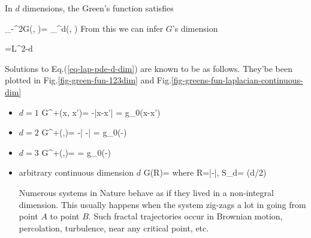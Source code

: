 In $d$ dimensions, the Green's function
satisfies

\beq
{}_{-\nabla^2G(\vecr, \vecrp)}=
_{\delta^d(\vecr, \vecrp)}
\label{eq-lap-pde-d-dim}
\eeq
From this we can infer
$G$'s dimension

\beq
{}=L^{2-d}
\eeq

Solutions to
Eq.(\ref{eq-lap-pde-d-dim})
are known to be as follows.
They'be been plotted
in Fig.\ref{fig-green-fun-123dim}
and Fig.\ref{fig-greens-fun-laplacian-continuous-dim}
\begin{itemize}
\item $d=1$
\beq
G^+(x, x')= -\;|x-x'| = g_0(x-x')
\eeq
\item $d=2$
\beq
G^+(\vecr,\vecrp)= -\;\ln |\vecr
-\vecrp| = g_0(\vecr-\vecrp)
\eeq
\item $d=3$
\beq
G^+(\vecr,\vecrp)= \; = g_0(\vecr-\vecrp)
\eeq


\item arbitrary continuous dimension $d$
\beq
G(R)=
\eeq
where
\beq 
R=|\vecr-\vecrp|, \quad S_d= 
{\Gamma(d/2)}
\eeq

Numerous systems in Nature
behave as if they lived
in a non-integral dimension.
This usually happens
when the system zig-zags a lot
in going from point $A$ to point $B$. Such fractal
trajectories occur in Brownian motion,
percolation, turbulence,
near any critical point, etc.
\end{itemize}




